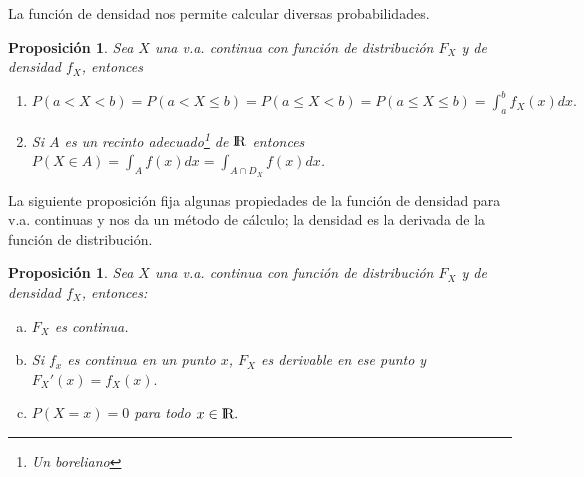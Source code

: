 \documentclass[12pt]{report}
\newtheorem{proposition}[definition]{Proposici\'on}
\begin{document}
La función de densidad nos permite calcular diversas probabilidades.

\begin{proposition} Sea $X$ una v.a. continua con función de distribución $F_X$ y de
densidad $f_X$, entonces
\begin{enumerate}
 \item $P(a< X< b)=P(a<X\leq b)= P(a\leq X< b)= P(a\leq X\leq b)=\int_{a}^b f_X(x) dx.$
\item Si $A$ es un recinto adecuado\footnote{ Un boreliano} de $\mbox{I\kern-.2em\hbox{R}}$ entonces $P(X\in
A)=\int_{A} f(x) dx=\int_{A\cap D_X} f(x) dx$.
\end{enumerate}
\end{proposition}


La siguiente proposición fija algunas propiedades de la función de densidad para v.a.
continuas y nos da un método de cálculo; la densidad es la derivada de la función de
distribución.

\begin{proposition}

Sea $X$ una v.a. continua con función de distribución $F_X$ y de densidad $f_X$, entonces:

\begin{enumerate}[a)]
\item $F_X$ es continua.
\item Si $f_x$ es continua en un punto $x$, $F_X$ es derivable en ese punto y
$F_X'(x)=f_X(x).$
\item $P(X=x)=0$ para todo $x\in\mbox{I\kern-.2em\hbox{R}}.$
\end{enumerate}
\end{proposition}
\end{document}

